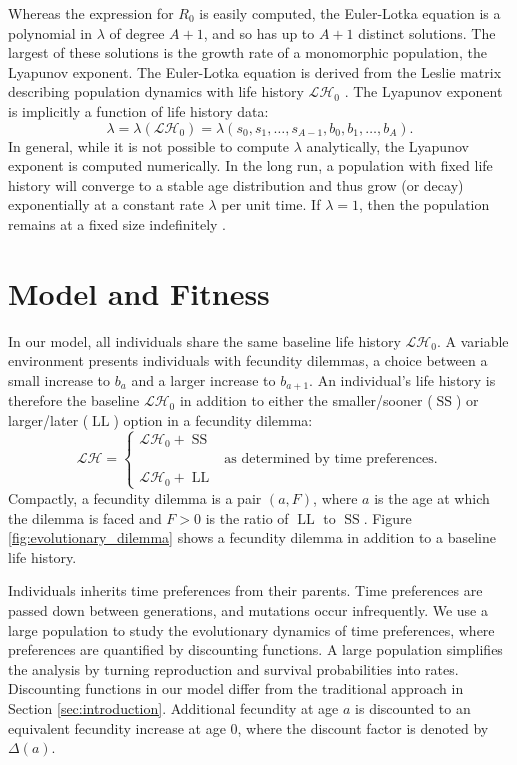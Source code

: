 \documentclass[titlepage, hidelinks, 12pt]{article}
\theoremstyle{plain}
\theoremstyle{remark}
\theoremstyle{definition}
\newcommand{\LH}{\mathcal{LH}}
\DeclareMathOperator{\smallersooner}{SS}
\DeclareMathOperator{\largerlater}{LL}
\begin{document}
Whereas the expression for $R_0$ is easily computed, the Euler-Lotka equation
is a polynomial in $\lambda$ of degree $A+1$, and so has up to $A+1$ distinct solutions. The largest of these solutions is the growth
rate of a monomorphic population, the Lyapunov exponent.
The Euler-Lotka equation is derived from the Leslie matrix describing population dynamics with life history $\LH_0$ \cite{stearns92}.
The Lyapunov exponent is implicitly a function of life history data: 
\begin{equation}
    \lambda = \lambda(\LH_0) = \lambda(s_0, s_1, \ldots, s_{A-1}, b_0, b_1, \ldots, b_{A}).
    \label{eqn:lambda_function}
\end{equation}
In general, while it is not possible to compute $\lambda$ analytically, the Lyapunov exponent is computed numerically. 
In the long run, a population with fixed life history will converge to a stable age distribution and
thus grow (or decay) 
exponentially at a constant rate $\lambda$ per unit time. If $\lambda = 1$, then the population remains at a fixed size indefinitely \cite{stearns92}.

\section{Model and Fitness} \label{sec:m and f}

In our model, all individuals share the same baseline life history $\LH_0$. A variable environment presents
individuals with fecundity dilemmas,  
a choice between a small increase to $b_a$ and a larger increase to $b_{a+1}$. 
An individual's life history is therefore the baseline $\LH_0$ in addition to either the smaller/sooner ($\smallersooner$)
or larger/later ($\largerlater$) option in a fecundity dilemma: 
\begin{equation}
    \LH = \begin{cases}
        \LH_0 + \smallersooner &  \\
        & \text{as determined by time preferences.} \\
        \LH_0 + \largerlater & 
    \end{cases}
    \label{eqn:life_history_equation}
\end{equation}
Compactly, a fecundity dilemma is a pair $(a, F)$, where $a$ is the
age at which the dilemma is faced and $F > 0$ is the ratio of $\largerlater$ to $\smallersooner$. 
Figure \ref{fig:evolutionary_dilemma}
shows a fecundity dilemma in addition to a baseline life history. 

Individuals inherits time preferences from their parents. Time preferences are passed down between generations, and 
mutations occur infrequently. We use a large population to study the evolutionary dynamics of time preferences, where preferences
are quantified by discounting functions. A large population
simplifies the analysis by turning reproduction and survival probabilities into rates. 
Discounting functions in our model differ from the traditional approach in Section \ref{sec:introduction}. 
Additional fecundity at age $a$ is discounted to an equivalent fecundity increase at age $0$, where the discount
factor is denoted by $\Delta(a)$. 
\end{document}

